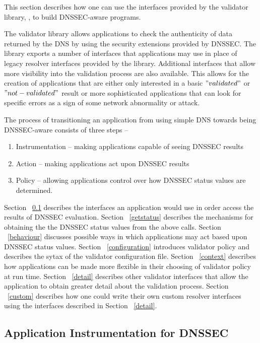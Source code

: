 This section describes how one can use the interfaces provided by the validator 
library, , to build DNSSEC-aware programs.

The validator library allows applications to check the authenticity 
of data returned by the DNS by using the security extensions 
provided by DNSSEC.  The library exports a number of interfaces 
that applications may use in place of legacy resolver interfaces provided by the 
 library. Additional interfaces that allow more visibility into the 
validation process are also available. This allows
for the creation of applications that are either only interested in a basic
$"validated"$ or $"not-validated"$ result or more sophisticated applications that
can look for specific errors as a sign of some network abnormality or attack.

The process of transitioning an application from using simple DNS towards being
DNSSEC-aware consists of three steps -- 
\begin{enumerate}
\item Instrumentation -- making applications capable of seeing DNSSEC results 
\item Action -- making applications act upon DNSSEC results
\item Policy -- allowing applications control over how DNSSEC status values are determined.
\end{enumerate}

Section ~\ref{instrumentation} describes the interfaces an application would use in order 
access the results of DNSSEC evaluation. Section ~\ref{getstatus} describes 
the mechanisms for obtaining the the DNSSEC status values from the above calls.
Section ~\ref{behaviour} discusses possible ways in which applications may
act based upon DNSSEC status values. Section ~\ref{configuration} introduces 
validator policy and describes the sytax of the validator configuration file. 
Section ~\ref{context} describes how applications can be made more flexible
in their choosing of validator policy at run time. Section ~\ref{detail} 
describes other validator interfaces that allow the application to obtain greater 
detail about the validation process. Section ~\ref{custom} describes how one 
could write their own custom resolver interfaces using the interfaces described in 
Section ~\ref{detail}.


\subsection{Application Instrumentation for DNSSEC}
\label{instrumentation}
                                                                                                                             
